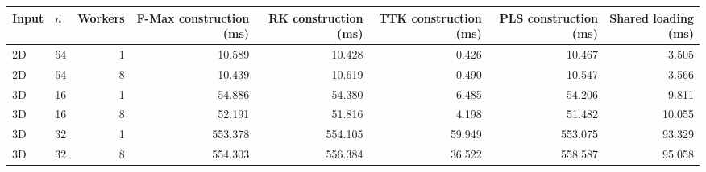 \begin{tabular}{llrrrrrr}
\hline
Input & $n$ & Workers & F-Max construction (ms) & RK construction (ms) & TTK construction (ms) & PLS construction (ms) & Shared loading (ms) \\
\hline
2D & 64 & 1 & 10.589 & 10.428 & 0.426 & 10.467 & 3.505 \\
2D & 64 & 8 & 10.439 & 10.619 & 0.490 & 10.547 & 3.566 \\
3D & 16 & 1 & 54.886 & 54.380 & 6.485 & 54.206 & 9.811 \\
3D & 16 & 8 & 52.191 & 51.816 & 4.198 & 51.482 & 10.055 \\
3D & 32 & 1 & 553.378 & 554.105 & 59.949 & 553.075 & 93.329 \\
3D & 32 & 8 & 554.303 & 556.384 & 36.522 & 558.587 & 95.058 \\
\hline
\end{tabular}
